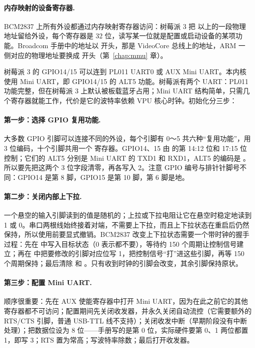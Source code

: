 \paragraph{内存映射的设备寄存器.} BCM2837 上所有外设都通过内存映射寄存器访问：树莓派 3 把  以上的一段物理地址留给外设，每个寄存器是 32 位，读写某一位就是配置或启动设备的某项功能。Broadcom 手册中的地址以  开头，那是 VideoCore 总线上的地址，ARM 一侧对应的物理地址要换成  开头（第~\ref{chap:mmu} 章）。

树莓派 3 的 GPIO14/15 可以连到 PL011 UART0 或 AUX Mini UART。本内核使用 Mini UART，即 GPIO14/15 的 ALT5 功能。树莓派有两个 UART：PL011 功能完整，但在树莓派 3 上默认被板载蓝牙占用；Mini UART 结构简单，只需几个寄存器就能工作，代价是它的波特率依赖 VPU 核心时钟。初始化分三步：

\paragraph{第一步：选择 GPIO 复用功能.} 大多数 GPIO 引脚可以连接不同的外设，每个引脚有 0～5 共六种“复用功能”，用 3 位编码，十个引脚共用一个  寄存器。GPIO14、15 由  的第 14:12 位和 17:15 位控制；它们的 ALT5 分别是 Mini UART 的 TXD1 和 RXD1，ALT5 的编码是 。所以要先把这两个 3 位字段清零，再各写入 2。注意 GPIO 编号与排针针脚号不同：GPIO14 是第 8 脚，GPIO15 是第 10 脚，第 6 脚是地。

\paragraph{第二步：关闭内部上下拉.} 一个悬空的输入引脚读到的值是随机的；上拉或下拉电阻让它在悬空时稳定地读到 1 或 0。串口两根线始终接着对端，不需要上下拉，而且上下拉状态在重启后仍然保持，所以使用前要显式撤销。BCM2837 改变上下拉状态需要一个带时钟的握手过程：先在  中写入目标状态（0 表示都不要），等待约 150 个周期让控制信号建立；再在  中把要修改的引脚对应位写 1，把控制信号“打”进这些引脚，再等 150 个周期保持；最后清除  和 。只有收到时钟的引脚会改变，其余引脚保持原状。

\paragraph{第三步：配置 Mini UART.} 顺序很重要：先在 AUX 使能寄存器中打开 Mini UART，因为在此之前它的其他寄存器都不可访问；配置期间先关闭收发器，并永久关闭自动流控（它需要额外的 RTS/CTS 引脚，普通 USB-TTL 线不支持）；关闭收发中断（早期阶段没有中断处理）；把数据位设为 8 位——手册写的是第 0 位，实际硬件要第 0、1 两位都置 1，即写 3；RTS 置为常高；写波特率除数；最后打开收发器。

